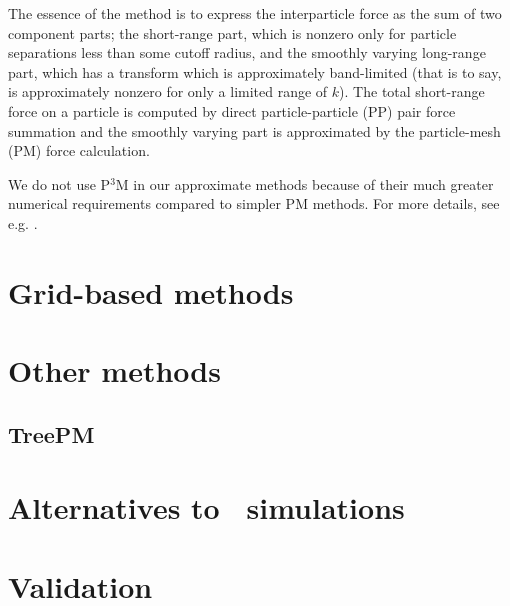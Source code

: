 The essence of the method is to express the interparticle force as the sum of two component parts; the short-range part, which is nonzero only for particle separations less than some cutoff radius, and the smoothly varying long-range part, which has a transform which is approximately band-limited (that is to say, is approximately nonzero for only a limited range of $k$). The total short-range force on a particle is computed by direct particle-particle (PP) pair force summation and the smoothly varying part is approximated by the particle-mesh (PM) force calculation.

We do not use P$^3$M in our approximate methods because of their much greater numerical requirements compared to simpler PM methods. For more details, see e.g. \textcite{Hockney:1988:CSU:62815}.
\section{Grid-based methods}
\section{Other methods}
\subsection{TreePM}
\section{Alternatives to \nbody\ simulations}

\section{Validation}